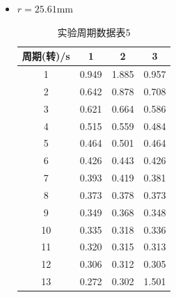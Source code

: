 \documentclass[12pt,hyperref,a4paper,UTF8]{ctexart}
\begin{document}
\begin{itemize}
            \item $r=25.61\text{mm}$
            \begin{table}[h!]
                \centering
                \begin{tabular}{cccc}
                \toprule
                \textbf{周期(转)/s} & \textbf{1} & \textbf{2} & \textbf{3} \\
                \midrule
                1  & 0.949 & 1.885 & 0.957 \\
                2  & 0.642 & 0.878 & 0.708 \\
                3  & 0.621 & 0.664 & 0.586 \\
                4  & 0.515 & 0.559 & 0.484 \\
                5  & 0.464 & 0.501 & 0.464 \\
                6  & 0.426 & 0.443 & 0.426 \\
                7  & 0.393 & 0.419 & 0.381 \\
                8  & 0.373 & 0.378 & 0.373 \\
                9  & 0.349 & 0.368 & 0.348 \\
                10 & 0.335 & 0.318 & 0.336 \\
                11 & 0.320 & 0.315 & 0.313 \\
                12 & 0.306 & 0.312 & 0.305 \\
                13 & 0.272 & 0.302 & 1.501 \\
                \bottomrule
                \end{tabular}
                \caption{实验周期数据表5}
                \end{table}
                
    \end{itemize}
\end{document}
